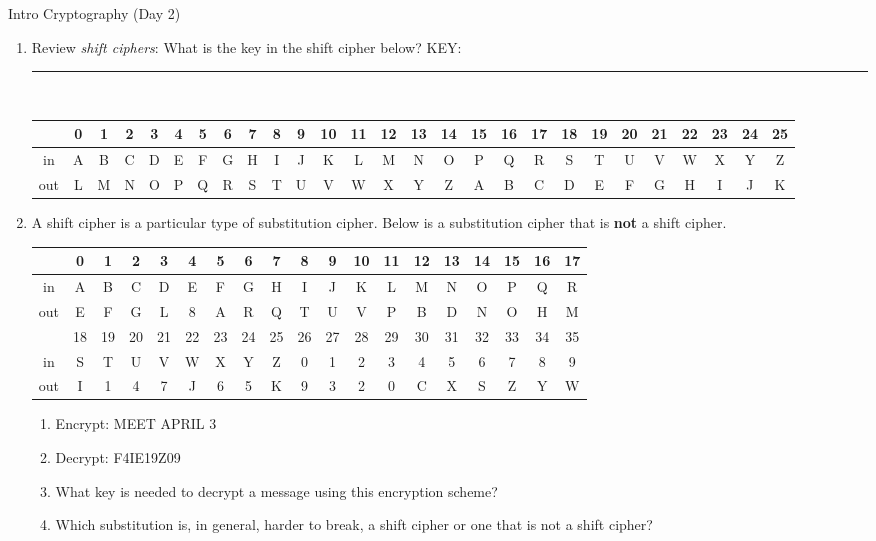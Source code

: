 \documentclass[12pt]{article}
\newcommand{\ans}[1][1in]{\rule{#1}{.5pt}}
\begin{document}
\begin{center}
{\Large  Intro Cryptography (Day 2)}
\end{center}
\begin{enumerate}
\item Review \emph{shift ciphers}: What is the key in the shift cipher below? KEY: \ans\\

\hspace*{-2.2cm}
{\scriptsize
\begin{tabular}{|c|c|c|c|c|c|c|c|c|c|c|c|c|c|c|c|c|c|c|c|c|c|c|c|c|c|c|}
\hline
&0&1&2&3&4&5&6&7&8&9&10&11&12&13&14&15&16&17&18&19&20&21&22&23&24&25\\ \hline \hline
in& A&B&C&D&E&F&G&H&I&J&K&L&M&N&O&P&Q&R&S&T&U&V&W&X&Y&Z\\  \hline
out&L &M&N&O&P&Q&R&S&T&U&V&W&X&Y&Z&A&B&C&D&E&F&G&H&I&J&K\\[12pt]
\hline
\end{tabular}
}
\item A shift cipher is a particular type of substitution cipher. Below is a substitution cipher that is \textbf{not} a shift cipher.\\


{\scriptsize
\begin{tabular}{|c|c|c|c|c|c|c|c|c|c|c|c|c|c|c|c|c|c|c|}
\hline
&0&1&2&3&4&5&6&7&8&9&10&11&12&13&14&15&16&17\\ \hline \hline
in& A&B&C&D&E&F&G&H&I&J&K&L&M&N&O&P&Q&R\\  \hline
out&E&F&G&L&8&A&R&Q&T&U&V&P&B&D&N&O&H&M\\
\hline \hline
&18&19&20&21&22&23&24&25&26&27&28&29&30&31&32&33&34&35\\ \hline \hline
in&S&T&U&V&W&X&Y&Z&0&1&2&3&4&5&6&7&8&9\\ \hline
out&I&1&4&7&J&6&5&K&9&3&2&0&C&X&S&Z&Y&W \\
[12pt]
\hline
\end{tabular}
}
	\begin{enumerate}
	\item Encrypt: MEET APRIL 3\\
	
	\item Decrypt: F4IE19Z09\\
	
	\item What key is needed to decrypt a message using this encryption scheme?\\
	
	\item Which substitution is, in general, harder to break, a shift cipher or one that is not a shift cipher?\\
	

\end{enumerate}
\end{enumerate}
\end{document}
